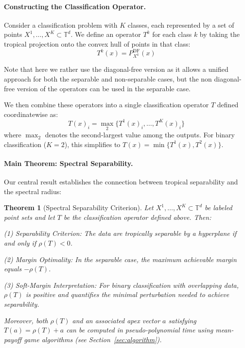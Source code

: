 \documentclass{article}
\newtheorem{theorem}{Theorem}
\newcommand{\trop}{\mathbb{T}}
\begin{document}
\paragraph{Constructing the Classification Operator.}
Consider a classification problem with $K$ classes, each represented by a set of points $X^1,\dots,X^K \subset \trop^d$. We define an operator $T^k$ for each class $k$ by taking the tropical projection onto the convex hull of points in that class:
\[
T^k(x) = P_{X^k}^{\text{DF}}(x)
\]

Note that here we rather use the diagonal-free version as it allows a unified approach for both the separable and non-separable cases, but the non diagonal-free version of the operators can be used in the separable case.

We then combine these operators into a single classification operator $T$ defined coordinatewise as:
\[
T(x)_i = \operatorname{\max}_2\{T^1(x)_i, \dots, T^K(x)_i\}
\]
where $\operatorname{\max}_2$ denotes the second-largest value among the outputs. For binary classification ($K=2$), this simplifies to $T(x)=\min\{T^1(x), T^2(x)\}$.

\paragraph{Main Theorem: Spectral Separability.}
Our central result establishes the connection between tropical separability and the spectral radius:
\begin{theorem}[Spectral Separability Criterion]\label{thm:spectral_separability}
Let $X^1,\ldots,X^K \subset \trop^d$ be labeled point sets and let $T$ be the classification operator defined above. Then:

(1) \textit{Separability Criterion:} The data are tropically separable by a hyperplane if and only if $\rho(T) < 0$.

(2) \textit{Margin Optimality:} In the separable case, the maximum achievable margin equals $-\rho(T)$.

(3) \textit{Soft-Margin Interpretation:} For binary classification with overlapping data, $\rho(T)$ is positive and quantifies the minimal perturbation needed to achieve separability.

Moreover, both $\rho(T)$ and an associated apex vector $a$ satisfying $T(a) = \rho(T)+a$ can be computed in pseudo-polynomial time using mean-payoff game algorithms (see Section~\ref{sec:algorithm}).
\end{theorem}
\end{document}
